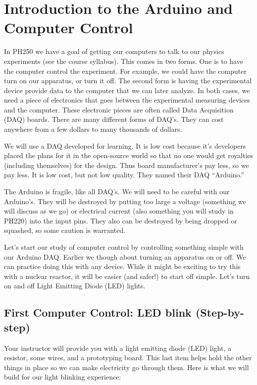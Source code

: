 \chapter{Introduction to the Arduino and Computer Control}
In PH250 we have a goal of getting our computers to talk to our physics
experiments (see the course syllabus). This comes in two forms. One is to
have the computer control the experiment. For example, we could have the
computer turn on our apparatus, or turn it off. The second form is having
the experimental device provide data to the computer that we can later
analyze. In both cases, we need a piece of electronics that goes between the
experimental measuring devices and the computer. These electronic pieces are
often called Data Acquisition (DAQ) boards. There are many different forms
of DAQ's. They can cost anywhere from a few dollars to many thousands of
dollars.

We will use a DAQ developed for learning. It is low cost because it's
developers placed the plans for it in the open-source world so that no one
would get royalties (including themselves) for the design. Thus board
manufacturer's pay less, so we pay less. It is low cost, but not low
quality. They named their DAQ \textquotedblleft Arduino.\textquotedblright\ 

The Arduino is fragile, like all DAQ's. We will need to be careful with our
Arduino's. They will be destroyed by putting too large a voltage (something
we will discuss as we go) or electrical current (also something you will
study in PH220) into the input pins. They also can be destroyed by being
dropped or squashed, so some caution is warranted.

Let's start our study of computer control by controlling something simple
with our Arduino DAQ. Earlier we though about turning an apparatus on or
off. We can practice doing this with any device. While it might be exciting
to try this with a nuclear reactor, it will be easier (and safer!) to start
off simple. Let's turn on and off Light Emitting Diode (LED) lights.

\section{First Computer Control: LED blink (Step-by-step)}

Your instructor will provide you with a light emitting diode (LED) light, a
resistor, some wires, and a prototyping board. This last item helps hold the
other things in place so we can make electricity go through them. Here is
what we will build for our light blinking experience:


